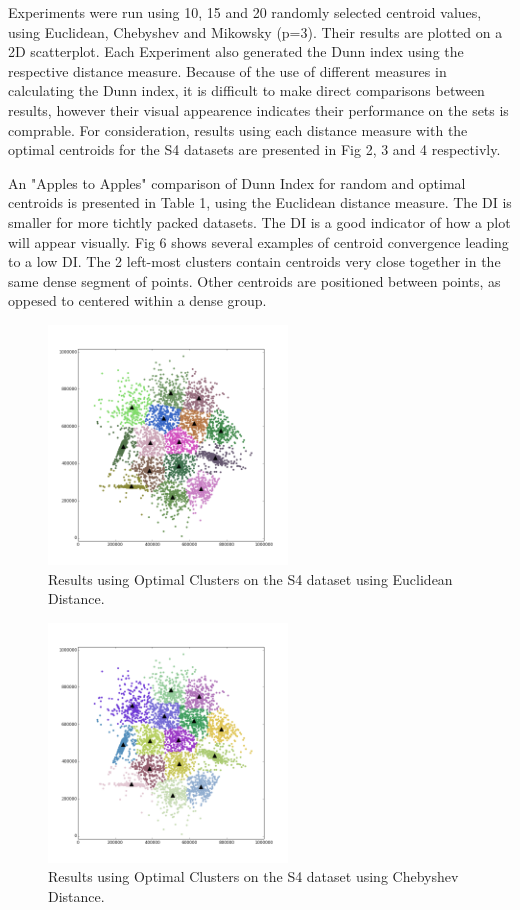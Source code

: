 \documentclass[journal]{IEEEtran}
\begin{document}
Experiments were run using 10, 15 and 20 randomly selected centroid values, using Euclidean, Chebyshev and Mikowsky (p=3). Their results are plotted on a 2D scatterplot. Each Experiment also generated the Dunn index using the respective distance measure. Because of the use of different measures in calculating the Dunn index, it is difficult to make direct comparisons between results, however their visual appearence indicates their performance on the sets is comprable. For consideration, results using each distance measure with the optimal centroids for the S4 datasets are presented in Fig 2, 3 and 4 respectivly.

An "Apples to Apples" comparison of Dunn Index for random and optimal centroids is presented in Table 1, using the Euclidean distance measure. The DI is smaller for more tichtly packed datasets. The DI is a good indicator of how a plot will appear visually. Fig 6 shows several examples of centroid convergence leading to a low DI. The 2 left-most clusters contain centroids very close together in the same dense segment of points. Other centroids are positioned between points, as oppesed to centered within a dense group.

\begin{figure}[!t]
	\centering
	\includegraphics[width=2.5in]{../figs/s4_true_euclid_comp_15.png}
	\caption{Results using Optimal Clusters on the S4 dataset using Euclidean Distance.}
	\label{fig_sim}
\end{figure}

\begin{figure}[!t]
	\centering
	\includegraphics[width=2.5in]{../figs/s4_true_cheby_comp_15.png}
	\caption{Results using Optimal Clusters on the S4 dataset using Chebyshev Distance.}
	\label{fig_sim}
\end{figure}
\end{document}
